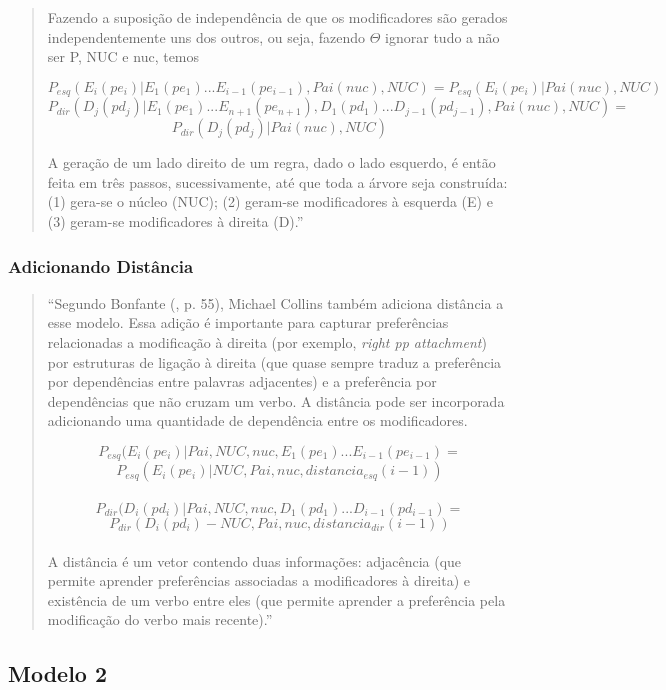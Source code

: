 \begin{quotation}
Fazendo a suposição de independência de que os modificadores são gerados independentemente uns dos outros, ou seja, fazendo $\Theta$ ignorar tudo a não ser P, NUC e nuc, temos

$$P_{esq}(E_i(pe_i)|E_1(pe_1)...E_{i-1}(pe_{i-1}), Pai(nuc),NUC) = P_{esq}(E_i(pe_i)|Pai(nuc),NUC)$$
$$P_{dir}(D_j(pd_j)|E_1(pe_1)...E_{n+1}(pe_{n+1}),D_1(pd_1)...D_{j-1}(pd_{j-1}), Pai(nuc),NUC) =$$
$$P_{dir}(D_j(pd_j)|Pai(nuc),NUC)$$

A geração de um lado direito de um regra, dado o lado esquerdo, é então feita em
três passos, sucessivamente, até que toda a árvore seja construída: (1) gera-se o núcleo (NUC); (2) geram-se modificadores à esquerda (E) e (3) geram-se modificadores à direita (D).''
\end{quotation}

\subsubsection{Adicionando Distância}
\label{sub:distancia}

\begin{quotation}
\footnotesize
``Segundo Bonfante (\cite{bonfante03}, p. 55), Michael Collins também adiciona distância a esse modelo. Essa adição é importante para capturar preferências relacionadas a modificação à direita (por exemplo, \emph{right pp attachment}) por estruturas de ligação à direita (que quase sempre traduz a preferência por dependências entre palavras adjacentes) e a preferência por dependências que não cruzam um verbo. A distância pode ser incorporada adicionando uma quantidade de dependência entre os modificadores.

$$P_{esq}(E_i(pe_i)|Pai,NUC, nuc,E_1(pe_1)...E_{i-1}(pe_{i - 1}) = $$
$$P_{esq}(E_i(pe_i)|NUC, Pai, nuc, distancia_{esq}(i - 1))$$
\\
$$P_{dir}(D_i(pd_i)|Pai,NUC, nuc,D_1(pd_1)...D_{i-1}(pd_{i - 1}) = $$
$$P_{dir}(D_i(pd_i)-NUC, Pai, nuc, distancia_{dir}(i - 1))$$
\\

A distância é um vetor contendo duas informações: adjacência (que permite aprender preferências associadas a modificadores à direita) e existência de um verbo entre eles (que permite aprender a preferência pela modificação do verbo mais recente).''
\end{quotation}

\subsection{Modelo 2}
\label{sub:modelo2}

